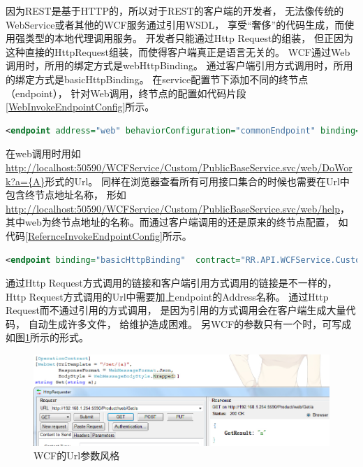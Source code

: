 \documentclass{book}
\begin{document}
因为REST是基于HTTP的，所以对于REST的客户端的开发者，
无法像传统的 WebService或者其他的WCF服务通过引用WSDL，
享受“奢侈”的代码生成，而使用强类型的本地代理调用服务。 
开发者只能通过Http Request的组装， 
但正因为这种直接的HttpRequest组装，而使得客户端真正是语言无关的。
WCF通过Web调用时，所用的绑定方式是webHttpBinding。
通过客户端引用方式调用时，所用的绑定方式是basicHttpBinding。
在service配置节下添加不同的终节点（endpoint），
针对Web调用，终节点的配置如代码片段\ref{WebInvokeEndpointConfig}所示。

\begin{lstlisting}[language=XML,caption=Web调用的终节点配置,label=WebInvokeEndpointConfig]
<endpoint address="web" behaviorConfiguration="commonEndpoint" binding="webHttpBinding" contract="RR.API.WCFService.Custom.IPublicBaseService"/>
\end{lstlisting}

在web调用时用如\url{http://localhost:50590/WCFService/Custom/PublicBaseService.svc/web/DoWork?a={A}}形式的Url。
同样在浏览器查看所有可用接口集合的时候也需要在Url中包含终节点地址名称，
形如\url{http://localhost:50590/WCFService/Custom/PublicBaseService.svc/web/help}，
其中web为终节点地址的名称。而通过客户端调用的还是原来的终节点配置，
如代码\ref{RefernceInvokeEndpointConfig}所示。

\begin{lstlisting}[language=XML,caption=客户端引用调用service终节点配置,label=RefernceInvokeEndpointConfig]
<endpoint binding="basicHttpBinding"  contract="RR.API.WCFService.Custom.IPublicBaseService"></endpoint>
\end{lstlisting}

通过Http Request方式调用的链接和客户端引用方式调用的链接是不一样的，
Http Request方式调用的Url中需要加上endpoint的Address名称。
通过Http Request而不通过引用的方式调用，
是因为引用的方式调用会在客户端生成大量代码，
自动生成许多文件，
给维护造成困难。
另WCF的参数只有一个时，可写成如图\ref{fig:WCFParamStyle}所示的形式。

\begin{figure}[htbp]
	\centering
	\includegraphics[scale=0.6]{WCFParamStyle.jpg}
	\caption{WCF的Url参数风格}
	\label{fig:WCFParamStyle}
\end{figure}
\end{document}
